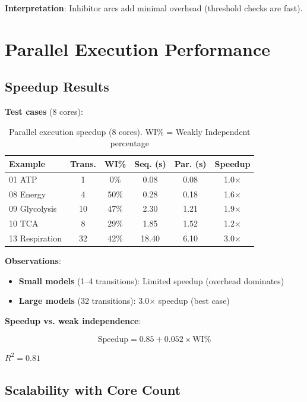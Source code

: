 \textbf{Interpretation}: Inhibitor arcs add minimal overhead (threshold checks are fast).

\section{Parallel Execution Performance}
\label{sec:parallel-performance}

\subsection{Speedup Results}
\label{subsec:speedup-results}

\textbf{Test cases} (8 cores):

\begin{table}[h]
\centering
\begin{tabular}{@{}lccccc@{}}
\toprule
\textbf{Example} & \textbf{Trans.} & \textbf{WI\%} & \textbf{Seq. (s)} & \textbf{Par. (s)} & \textbf{Speedup} \\
\midrule
01 ATP & 1 & 0\% & 0.08 & 0.08 & 1.0$\times$ \\
08 Energy & 4 & 50\% & 0.28 & 0.18 & 1.6$\times$ \\
09 Glycolysis & 10 & 47\% & 2.30 & 1.21 & 1.9$\times$ \\
10 TCA & 8 & 29\% & 1.85 & 1.52 & 1.2$\times$ \\
13 Respiration & 32 & 42\% & 18.40 & 6.10 & 3.0$\times$ \\
\bottomrule
\end{tabular}
\caption{Parallel execution speedup (8 cores). WI\% = Weakly Independent percentage}
\label{tab:parallel-speedup}
\end{table}

\textbf{Observations}:

\begin{itemize}
    \item \textbf{Small models} (1--4 transitions): Limited speedup (overhead dominates)
    \item \textbf{Large models} (32 transitions): 3.0$\times$ speedup (best case)
\end{itemize}

\textbf{Speedup vs. weak independence}:

\begin{equation}
\text{Speedup} = 0.85 + 0.052 \times \text{WI\%}
\end{equation}

$R^2 = 0.81$

\subsection{Scalability with Core Count}
\label{subsec:core-scalability}

